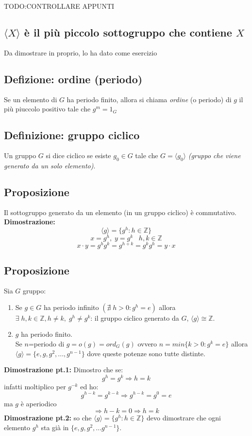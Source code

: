 TODO:CONTROLLARE APPUNTI

\subsection{\(\langle X\rangle\) è il più piccolo sottogruppo che contiene \(X\)}
Da dimostrare in proprio, lo ha dato come esercizio

\subsection{Defizione: ordine (periodo)}
Se un elemento di \(G\) ha periodo finito, allora si chiama \textit{ordine} (o periodo) di \(g\) il più piuccolo positivo tale che \(g^m=1_G\)

\subsection{Definizione: gruppo ciclico}
Un gruppo \(G\) si dice ciclico se esiste \(g_0\in G\) tale che \(G=\langle g_0\rangle\) \textit{(gruppo che viene generato da un solo elemento)}.

\subsection{Proposizione}
Il sottogruppo generato da un elemento (in un gruppo ciclico) è commutativo.
\\
\textbf{Dimostrazione:}
\[\langle g\rangle =\{g^h:h\in\mathbb{Z}\}\]
\[x=g^h,\;y=g^k\;\;\;h,k\in\mathbb{Z}\]
\[x\cdot y=g^hg^k=g^{h+k}=g^kg^h=y\cdot x\]

\subsection{Proposizione}
Sia \(G\) gruppo:
\begin{enumerate}

	\item Se \(g\in G\) ha periodo infinito \((\nexists \;h>0:g^h=e)\) allora \(\exists\; h,k\in\mathbb{Z}, h\neq k,\;g^h\neq g^k\): il gruppo ciclico generato da \(G\), \(\langle g\rangle \cong\mathbb{Z}\).

	\item \(g\) ha periodo finito.
	\\Se \(n\)=periodo di \(g=o(g)=ord_G(g)\) %
	ovvero \(n=min\{k>0: g^k=e\}\) allora \(\langle g\rangle=\{e,g,g^2,...,g^{n-1}\}\) dove queste potenze sono tutte distinte.

\end{enumerate}
\textbf{Dimostrazione pt.1:} Dimostro che se:
\[g^h=g^k\Rightarrow h=k\]
infatti moltiplico per \(g^{-k}\) ed ho:
\[g^{h-k}=g^{k-k}\Rightarrow g^{h-k}=g^0=e\]
ma \(g\) è aperiodico 
\[\Rightarrow h-k=0\Rightarrow h=k\]
\textbf{Dimostrazione pt.2:} so che \(\langle g\rangle =\{g^h:h\in\mathbb{Z}\}\) devo dimostrare che ogni elemento \(g^h\) sta già in \(\{e,g,g^2,...g^{n-1}\}\).

